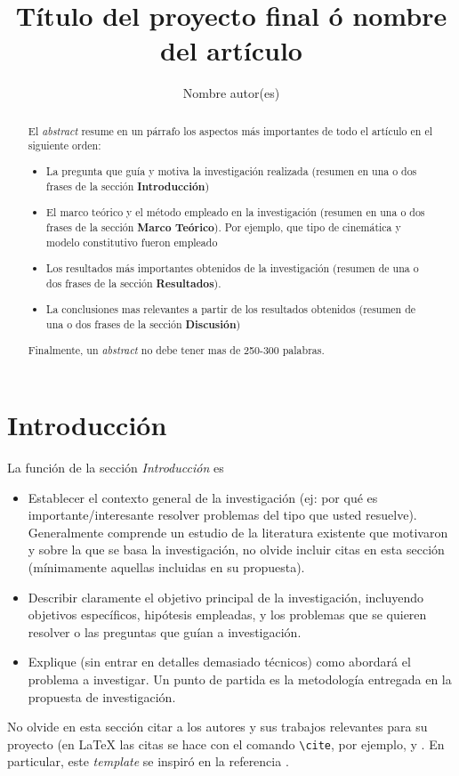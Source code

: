 \documentclass[12pt, letterpaper]{article}
\title{T\'itulo del proyecto final \'o nombre del art\'iculo}
\author{Nombre autor(es)}
\date{}
\begin{document}
\maketitle

\begin{abstract}
	El {\it abstract} resume en un p\'arrafo los aspectos m\'as importantes de todo el art\'iculo en el siguiente orden:
	\begin{itemize}
		\item La pregunta que gu\'ia y motiva la investigaci\'on realizada (resumen en una o dos frases de la secci\'on {\bf Introducci\'on})
		\item El marco te\'orico y el m\'etodo empleado en la investigaci\'on (resumen en una o dos frases de la secci\'on {\bf Marco Te\'orico}). Por ejemplo, que tipo de cinem\'atica y modelo constitutivo fueron empleado
		\item Los resultados m\'as importantes obtenidos de la investigaci\'on (resumen de una o dos frases de la secci\'on {\bf Resultados}).
		\item La conclusiones mas relevantes a partir de los resultados obtenidos (resumen de una o dos frases de la secci\'on {\bf Discusi\'on})
	\end{itemize}
 Finalmente, un {\it abstract} no debe tener mas de 250-300 palabras.
\end{abstract}

\section{Introducci\'on}
La funci\'on de la secci\'on {\it Introducci\'on} es 
\begin{itemize}
	\item Establecer el contexto general de la investigaci\'on (ej: por qu\'e es importante/interesante resolver problemas del tipo que usted resuelve). Generalmente comprende un estudio de la literatura existente que motivaron y sobre la que se basa la investigaci\'on, no olvide incluir citas en esta secci\'on (m\'inimamente aquellas incluidas en su propuesta).
	\item Describir claramente el objetivo principal de la investigaci\'on, incluyendo objetivos espec\'ificos, hip\'otesis empleadas, y los problemas que se quieren resolver o las preguntas que gu\'ian a investigaci\'on.
	\item Explique (sin entrar en detalles demasiado t\'ecnicos) como abordar\'a el problema a investigar. Un punto de partida es la metodolog\'ia entregada en la propuesta de investigaci\'on.
\end{itemize}
No olvide en esta secci\'on citar a los autores y sus trabajos relevantes para su proyecto (en {\LaTeX} las citas se hace con el comando {\tt \textbackslash cite{}}, por ejemplo, \cite{hughes2000} y  \cite{goktepekuhl2009}. En particular, este {\it template} se inspir\'o en la referencia \cite{riceweb}.
\end{document}
